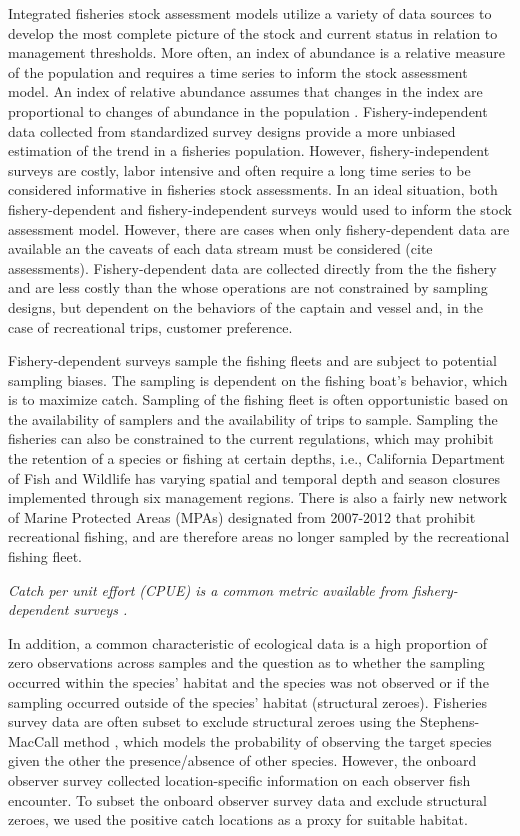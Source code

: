 \documentclass[
  authoryear,
  preprint,
  3p]{elsarticle}
\begin{document}
Integrated fisheries stock assessment models utilize a variety of data
sources to develop the most complete picture of the stock and current
status in relation to management thresholds. More often, an index of
abundance is a relative measure of the population and requires a time
series to inform the stock assessment model. An index of relative
abundance assumes that changes in the index are proportional to changes
of abundance in the population \citep{Harley:2001:CUE}.
Fishery-independent data collected from standardized survey designs
provide a more unbiased estimation of the trend in a fisheries
population. However, fishery-independent surveys are costly, labor
intensive and often require a long time series to be considered
informative in fisheries stock assessments. In an ideal situation, both
fishery-dependent and fishery-independent surveys would used to inform
the stock assessment model. However, there are cases when only
fishery-dependent data are available an the caveats of each data stream
must be considered (cite assessments). Fishery-dependent data are
collected directly from the the fishery and are less costly than the
whose operations are not constrained by sampling designs, but dependent
on the behaviors of the captain and vessel and, in the case of
recreational trips, customer preference.

Fishery-dependent surveys sample the fishing fleets and are subject to
potential sampling biases. The sampling is dependent on the fishing
boat's behavior, which is to maximize catch. Sampling of the fishing
fleet is often opportunistic based on the availability of samplers and
the availability of trips to sample. Sampling the fisheries can also be
constrained to the current regulations, which may prohibit the retention
of a species or fishing at certain depths, i.e., California Department
of Fish and Wildlife has varying spatial and temporal depth and season
closures implemented through six management regions. There is also a
fairly new network of Marine Protected Areas (MPAs) designated from
2007-2012 that prohibit recreational fishing, and are therefore areas no
longer sampled by the recreational fishing fleet.

\emph{Catch per unit effort (CPUE) is a common metric available from
fishery-dependent surveys \citep{Maunder:2004:SCE}.}

In addition, a common characteristic of ecological data is a high
proportion of zero observations across samples and the question as to
whether the sampling occurred within the species' habitat and the
species was not observed or if the sampling occurred outside of the
species' habitat (structural zeroes). Fisheries survey data are often
subset to exclude structural zeroes using the Stephens-MacCall method
\citeyearpar{Stephens:2004:MAS}, which models the probability of
observing the target species given the other the presence/absence of
other species. However, the onboard observer survey collected
location-specific information on each observer fish encounter. To subset
the onboard observer survey data and exclude structural zeroes, we used
the positive catch locations as a proxy for suitable habitat.
\end{document}
